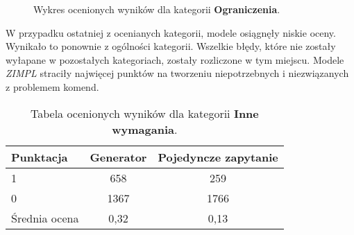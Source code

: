 \begin{figure}[H]
\centering
\begin{minipage}{0.45\textwidth}
\centering
{}
\end{minipage}%
\hspace{0.05\textwidth}
\begin{minipage}{0.45\textwidth}
\centering
{}
\end{minipage}
\caption{Wykres ocenionych wyników dla kategorii \textbf{Ograniczenia}.}
\end{figure}

W przypadku ostatniej z ocenianych kategorii, modele osiągnęły niskie oceny. Wynikało to ponownie z ogólności kategorii. Wszelkie błędy, które nie zostały wyłapane w pozostałych kategoriach, zostały rozliczone w tym miejscu. Modele  \textit{ZIMPL} straciły najwięcej punktów na tworzeniu niepotrzebnych i niezwiązanych z problemem komend. 

\begin{table}[ht]
\caption{Tabela ocenionych wyników dla kategorii \textbf{Inne wymagania}.}\label{tab:tabela22}
\centering%
\begin{tabular}{|l|c|c|}
\hline
\textbf{Punktacja} & \textbf{Generator} & \textbf{Pojedyncze zapytanie}\\
\hline
1 & 658 & 259 \\
\hline
0 & 1367 & 1766 \\
\hline
Średnia ocena & 0,32 & 0,13 \\
\hline
\end{tabular}
\end{table}


